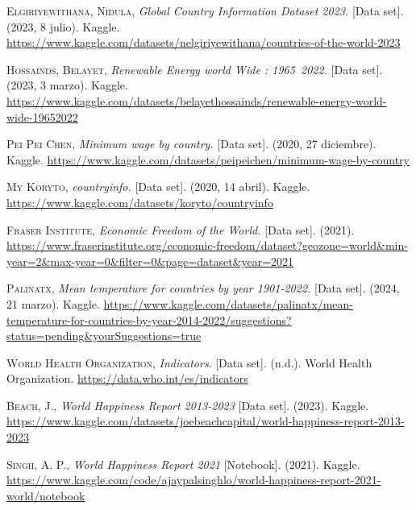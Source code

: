 \documentclass[fleqn,11pt]{article}
\begin{document}
\newpage
\begin{thebibliography}{10}
	
 \textsc{Elgiriyewithana, Nidula}, \textit{Global Country Information Dataset 2023.} [Data set]. (2023, 8 julio). Kaggle. \newline
\small{\url{https://www.kaggle.com/datasets/nelgiriyewithana/countries-of-the-world-2023}}

 \textsc{Hossainds, Belayet}, \textit{Renewable Energy world Wide : 1965~2022.} [Data set]. (2023, 3 marzo). Kaggle. \newline
\small{\url{https://www.kaggle.com/datasets/belayethossainds/renewable-energy-world-wide-19652022}}

 \textsc{Pei Pei Chen}, \textit{Minimum wage by country.} [Data set]. (2020, 27 diciembre). Kaggle. \newline
\small{\url{https://www.kaggle.com/datasets/peipeichen/minimum-wage-by-country}}

 \textsc{My Koryto}, \textit{countryinfo.} [Data set]. (2020, 14 abril). Kaggle. \newline
\small{\url{https://www.kaggle.com/datasets/koryto/countryinfo}}

 \textsc{Fraser Institute}, \textit{Economic Freedom of the World.} [Data set]. (2021). \newline
\small{\url{https://www.fraserinstitute.org/economic-freedom/dataset?geozone=world&min-year=2&max-year=0&filter=0&page=dataset&year=2021}}

 \textsc{Palinatx}, \textit{Mean temperature for countries by year 1901-2022.} [Data set]. (2024, 21 marzo). Kaggle. \newline
\small{\url{https://www.kaggle.com/datasets/palinatx/mean-temperature-for-countries-by-year-2014-2022/suggestions?status=pending&yourSuggestions=true}}

 \textsc{World Health Organization}, \textit{Indicators}. [Data set]. (n.d.). World Health Organization. \newline
\small{\url{https://data.who.int/es/indicators}}

 \textsc{Beach, J.}, \textit{World Happiness Report 2013-2023} [Data set]. (2023). Kaggle. \newline
\small{\url{https://www.kaggle.com/datasets/joebeachcapital/world-happiness-report-2013-2023}}

 \textsc{Singh, A. P.}, \textit{World Happiness Report 2021} [Notebook]. (2021). Kaggle. \newline
\small{\url{https://www.kaggle.com/code/ajaypalsinghlo/world-happiness-report-2021-world/notebook}}

\end{thebibliography}
\end{document}
